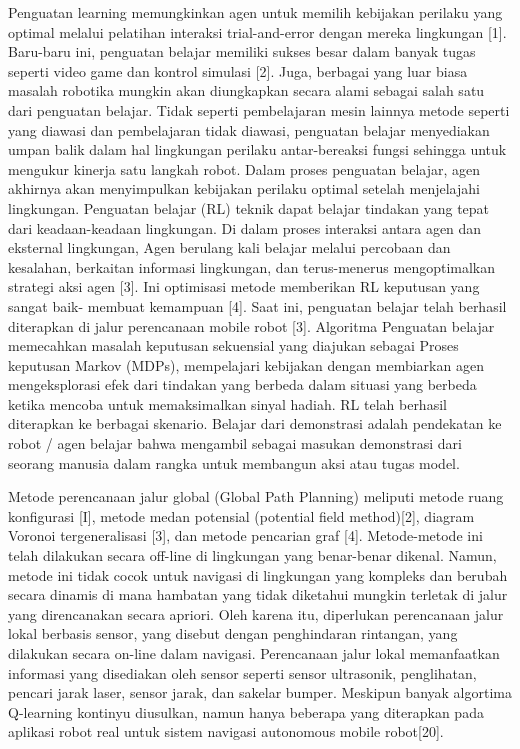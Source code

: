 Penguatan learning memungkinkan agen untuk memilih kebijakan perilaku yang optimal melalui pelatihan interaksi trial-and-error dengan mereka lingkungan [1]. Baru-baru ini, penguatan belajar memiliki sukses besar dalam banyak tugas seperti video game dan kontrol simulasi [2]. Juga, berbagai yang luar biasa masalah robotika mungkin akan diungkapkan secara alami sebagai salah satu dari penguatan belajar. Tidak seperti pembelajaran mesin lainnya metode seperti yang diawasi dan pembelajaran tidak diawasi, penguatan belajar menyediakan umpan balik dalam hal lingkungan perilaku antar-bereaksi fungsi sehingga untuk mengukur kinerja satu langkah robot. Dalam proses penguatan belajar, agen akhirnya akan menyimpulkan kebijakan perilaku optimal setelah menjelajahi lingkungan. Penguatan belajar (RL) teknik dapat belajar tindakan yang tepat dari keadaan-keadaan lingkungan. Di dalam proses interaksi antara agen dan eksternal lingkungan, Agen berulang kali belajar melalui percobaan dan kesalahan, berkaitan informasi lingkungan, dan terus-menerus mengoptimalkan strategi aksi agen [3]. Ini optimisasi metode memberikan RL keputusan yang sangat baik- membuat kemampuan [4]. Saat ini, penguatan belajar telah berhasil diterapkan di jalur perencanaan mobile robot [3]. Algoritma  Penguatan belajar memecahkan masalah keputusan sekuensial yang diajukan sebagai Proses keputusan Markov (MDPs), mempelajari kebijakan dengan membiarkan agen mengeksplorasi efek dari tindakan yang berbeda dalam situasi yang berbeda ketika mencoba untuk memaksimalkan sinyal hadiah. RL telah berhasil diterapkan ke berbagai skenario. Belajar dari demonstrasi adalah pendekatan ke robot / agen belajar bahwa mengambil sebagai masukan demonstrasi dari seorang manusia dalam rangka untuk membangun aksi atau tugas model. 

Metode perencanaan jalur global (Global Path Planning) meliputi metode ruang konfigurasi [I], metode medan potensial (potential field method)[2], diagram Voronoi tergeneralisasi [3], dan metode pencarian graf [4]. Metode-metode ini telah dilakukan secara off-line di lingkungan yang benar-benar dikenal. Namun, metode ini tidak cocok untuk navigasi di lingkungan yang kompleks dan berubah secara dinamis di mana hambatan yang tidak diketahui mungkin terletak di jalur yang direncanakan secara apriori. Oleh karena itu, diperlukan perencanaan jalur lokal berbasis sensor, yang disebut dengan penghindaran rintangan, yang dilakukan secara on-line dalam navigasi. Perencanaan jalur lokal memanfaatkan informasi yang disediakan oleh sensor seperti sensor ultrasonik, penglihatan, pencari jarak laser, sensor jarak, dan sakelar bumper. Meskipun banyak algortima Q-learning kontinyu diusulkan, namun hanya beberapa yang diterapkan pada aplikasi robot real untuk sistem navigasi autonomous mobile robot[20]. 
 
